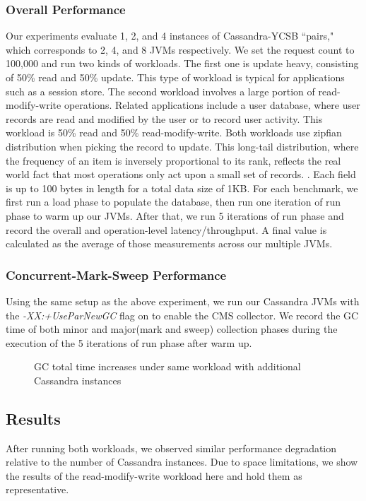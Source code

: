 \documentclass{sig-alternate}
\begin{document}
\subsubsection{Overall Performance}
Our experiments evaluate 1, 2, and 4 instances of Cassandra-YCSB ``pairs," which corresponds to 2, 4, and 8 JVMs respectively. We set the request count to 100,000 and run two kinds of workloads. The first one is update heavy, consisting of 50\% read and 50\% update. This type of workload is typical for applications such as a session store. The second workload involves a large portion of read-modify-write operations. Related applications include a user database, where user records are read and modified by the user or to record user activity. This workload is 50\% read and 50\% read-modify-write. Both workloads use zipfian distribution when picking the record to update. This long-tail distribution, where the frequency of an item is inversely proportional to its rank, reflects the real world fact that most operations only act upon a small set of records. \cite{adamic2002zipf}. Each field is up to 100 bytes in length for a total data size of 1KB. For each benchmark, we first run a load phase to populate the database, then run one iteration of run phase to warm up our JVMs. After that, we run 5 iterations of run phase and record the overall and operation-level latency/throughput. A final value is calculated as the average of those measurements across our multiple JVMs.

\subsubsection{Concurrent-Mark-Sweep Performance}
Using the same setup as the above experiment, we run our Cassandra JVMs with the \textit{-XX:+UseParNewGC} flag on to enable the CMS collector. We record the GC time of both minor and major(mark and sweep) collection phases during the execution of the 5 iterations of run phase after warm up.

\begin{figure}
\centering
{}
\caption{GC total time increases under same workload with additional Cassandra instances}
\label{fig:cassandragc}
\end{figure}

\subsection{Results}
After running both workloads, we observed similar performance degradation relative to the number of Cassandra instances. Due to space limitations, we show the results of the read-modify-write workload here and hold them as representative.
\end{document}
